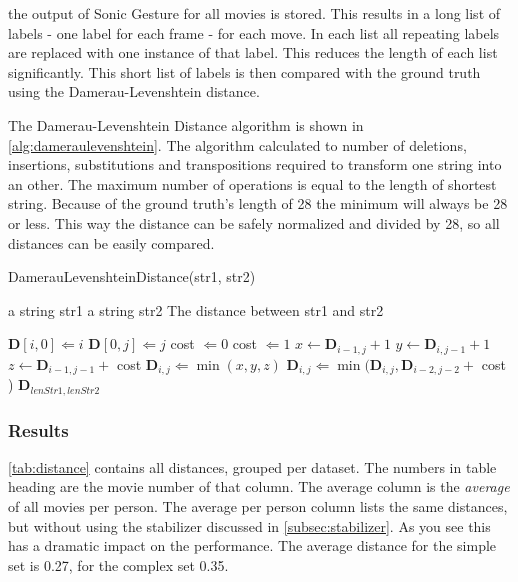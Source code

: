 the output of Sonic Gesture for all movies is stored. This results in a long list of labels - one label for each frame - for each move. In each list all repeating labels are replaced with one instance of that label. This reduces the length of each list significantly. This short list of labels is then compared with the ground truth using the Damerau-Levenshtein distance.


The Damerau-Levenshtein Distance algorithm is shown in \autoref{alg:dameraulevenshtein}. The algorithm calculated to number of deletions, insertions, substitutions and transpositions required to transform one string into an other. The maximum number of operations is equal to the length of shortest string. Because of the ground truth's length of 28 the minimum will always be 28 or less. This way the distance can be safely normalized and divided by 28, so all distances can be easily compared.

\begin{algorithm}
\caption{DamerauLevenshteinDistance(str1, str2)}
\label{alg:dameraulevenshtein}
\begin{algorithmic}
   \REQUIRE a string str1
   \REQUIRE a string str2
   \ENSURE The distance between str1 and str2

   \medskip

       \STATE $\mathbf{D}[i, 0] \Leftarrow i$
   \ENDFOR
       \STATE $\mathbf{D}[0, j] \Leftarrow j$
   \ENDFOR
				\STATE cost $\Leftarrow 0$
            \ELSE
				\STATE cost $\Leftarrow 1$
			\ENDIF
			\STATE $x \leftarrow \mathbf{D}_{i-1, j  } + 1$ %
			\STATE $y \leftarrow \mathbf{D}_{i  , j-1} + 1$ %
            \STATE $z \leftarrow \mathbf{D}_{i-1, j-1} + $ cost %
            \STATE $\mathbf{D}_{i, j} \Leftarrow \min(x, y, z)$
				\STATE $\mathbf{D}_{i, j} \Leftarrow \min(
                	\mathbf{D}_{i, j},
                    \mathbf{D}_{i-2, j-2} + $ cost  %
                )
			\ENDIF
		\ENDFOR
	\ENDFOR
   \RETURN $\mathbf{D}_{lenStr1, lenStr2}$

\end{algorithmic}
\end{algorithm}
	
\subsubsection{Results}
\autoref{tab:distance} contains all distances, grouped per dataset. The numbers in table heading are the movie number of that column. The average column is the \textit{average} of all movies per person. The average per person column lists the same distances, but without using the stabilizer discussed in \autoref{subsec:stabilizer}. As you see this has a dramatic impact on the performance. The average distance for the simple set is 0.27, for the complex set 0.35.

